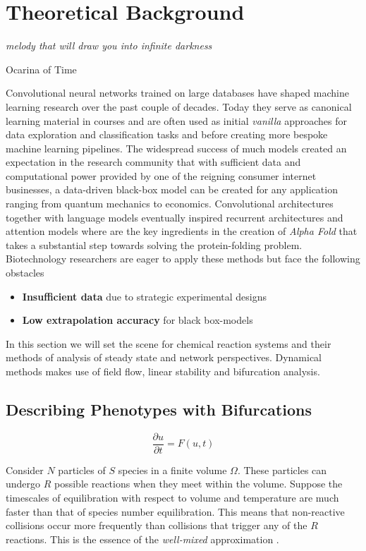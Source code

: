 \chapter{Theoretical Background}
\label{chapter:background}
\epigraph{\textit{melody that will draw you into infinite darkness}}{Ocarina of Time}

Convolutional neural networks trained on large databases \cite{mnist2012,imagenet2009} have shaped machine learning research over the past couple of decades. Today they serve as canonical learning material in courses and are often used as initial \textit{vanilla} approaches for data exploration and classification tasks and before creating more bespoke machine learning pipelines. The widespread success of much models created an expectation in the research community that with sufficient data and computational power provided by one of the reigning consumer internet businesses, a data-driven black-box model can be created for any application ranging from quantum mechanics to economics. Convolutional architectures together with language models eventually inspired recurrent architectures and attention models where are the key ingredients in the creation of \textit{Alpha Fold} \cite{Jumper2021HighlyAlphaFold} that takes a substantial step towards solving the protein-folding problem. Biotechnology researchers are eager to apply these methods but face the following obstacles

\begin{itemize}
    \item \textbf{Insufficient data} due to strategic experimental designs 
    \item \textbf{Low extrapolation accuracy} for black box-models
\end{itemize}

In this section we will set the scene for chemical reaction systems and their
methods of analysis of steady state and network perspectives. Dynamical
methods makes use of field flow, linear stability and bifurcation analysis.

\section{Describing Phenotypes with Bifurcations}

\begin{equation}
	\frac{\partial u}{\partial t} = F(u,t)
	\label{eq:odes}
\end{equation}

Consider $N$ particles of $S$ species in a finite volume $\Omega$. These particles
can undergo $R$ possible reactions when they meet within the volume. Suppose the
timescales of equilibration with respect to volume and temperature are much faster
than that of species number equilibration. This means that non-reactive collisions
occur more frequently than collisions that trigger any of the $R$ reactions. This
is the essence of the \textit{well-mixed} approximation \cite{Gillespie1992}.

